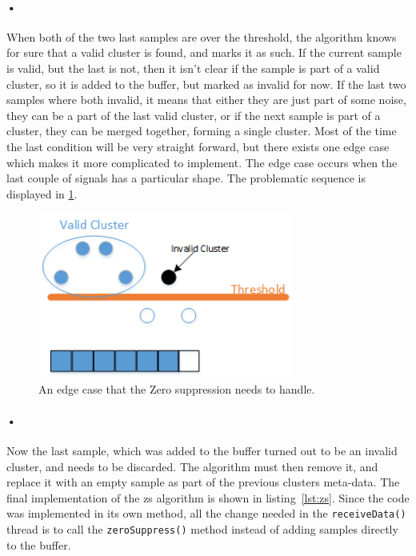 \documentclass[a4paper, 12pt]{report}
\newcommand{\codeword}[1]{\texttt{#1}}
\begin{document}
\paragraph{•}
When both of the two last samples are over the threshold, the algorithm knows for sure that a valid cluster is found, and marks it as such.
If the current sample is valid, but the last is not, then it isn't clear if the sample is part of a valid cluster, so it is added to the buffer, but marked as invalid for now.
If the last two samples where both invalid, it means that either they are just part of some noise, they can be a part of the last valid cluster, or if the next sample is part of a cluster, they can be merged together, forming a single cluster.
Most of the time the last condition will be very straight forward, but there exists one edge case which makes it more complicated to implement.
The edge case occurs when the last couple of signals has a particular shape.
The problematic sequence is displayed in \ref{fig:zs-prob}.

\begin{figure}[h!]
	\centering
		\includegraphics[width=0.75\textwidth]{images/zs-prob.png}
		\caption{An edge case that the Zero suppression needs to handle.}
		\label{fig:zs-prob}
\end{figure}

\paragraph{•}
Now the last sample, which was added to the buffer turned out to be an invalid cluster, and needs to be discarded.
The algorithm must then remove it, and replace it with an empty sample as part of the previous clusters meta-data.
The final implementation of the \gls{zs} algorithm is shown in listing~\ref{lst:zs}.
Since the code was implemented in its own method, all the change needed in the \codeword{receiveData()} thread is to call the \codeword{zeroSuppress()} method instead of adding samples directly to the buffer.
\end{document}
